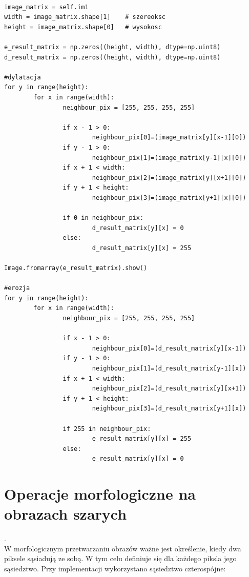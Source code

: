 \documentclass[final,a4paper,openany,12pt]{mwbk}
\begin{document}
\begin{lstlisting}[caption= Operacja zamknięcia na obrazie binarnym]

image_matrix = self.im1
width = image_matrix.shape[1]    # szereoksc
height = image_matrix.shape[0]   # wysokosc

e_result_matrix = np.zeros((height, width), dtype=np.uint8)
d_result_matrix = np.zeros((height, width), dtype=np.uint8)

#dylatacja
for y in range(height):
        for x in range(width):  
                neighbour_pix = [255, 255, 255, 255]

                if x - 1 > 0:
                        neighbour_pix[0]=(image_matrix[y][x-1][0])
                if y - 1 > 0:
                        neighbour_pix[1]=(image_matrix[y-1][x][0])
                if x + 1 < width:
                        neighbour_pix[2]=(image_matrix[y][x+1][0])
                if y + 1 < height:
                        neighbour_pix[3]=(image_matrix[y+1][x][0])

                if 0 in neighbour_pix:
                        d_result_matrix[y][x] = 0
                else:
                        d_result_matrix[y][x] = 255

Image.fromarray(e_result_matrix).show()

#erozja
for y in range(height):
        for x in range(width):  
                neighbour_pix = [255, 255, 255, 255]

                if x - 1 > 0:
                        neighbour_pix[0]=(d_result_matrix[y][x-1])
                if y - 1 > 0:
                        neighbour_pix[1]=(d_result_matrix[y-1][x])
                if x + 1 < width:
                        neighbour_pix[2]=(d_result_matrix[y][x+1])
                if y + 1 < height:
                        neighbour_pix[3]=(d_result_matrix[y+1][x])

                if 255 in neighbour_pix:
                        e_result_matrix[y][x] = 255
                else:
                        e_result_matrix[y][x] = 0         

\end{lstlisting}
\newpage


\chapter {Operacje morfologiczne na obrazach szarych}
.\hfill\\
\indent
W morfologicznym przetwarzaniu obrazów ważne jest określenie, kiedy dwa piksele sąsiadują ze sobą. W tym celu definiuje się dla każdego piksla jego sąsiedztwo. Przy implementacji wykorzystano sąsiedztwo czterospójne: 
\end{document}
